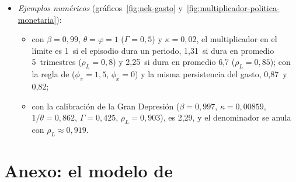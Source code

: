 \documentclass[11pt]{article}
\begin{document}
\begin{itemize}
\item \emph{Ejemplos numéricos} (gráficos~\ref{fig:nek-gasto} y~\ref{fig:multiplicador-politica-monetaria}):
  \begin{itemize}
  \item con $\beta=0{,}99$, $\theta=\varphi=1$ ($\Gamma=0{,}5$) y $\kappa=0{,}02$, el multiplicador en el límite es 1~si el episodio dura un periodo, 1,31~si dura en promedio 5~trimestres ($\rho_L=0{,}8$) y 2,25~si dura en promedio 6,7 ($\rho_L=0{,}85$); con la regla de  ($\phi_\pi=1{,}5$, $\phi_x=0$) y la misma persistencia del gasto, 0,87~y 0,82;
  \item con la calibración de la Gran Depresión ($\beta=0{,}997$, $\kappa=0{,}00859$, $1/\theta=0{,}862$, $\Gamma=0{,}425$, $\rho_L=0{,}903$), es 2,29, y el denominador se anula con $\rho_L\approx0{,}919$\nocite{Woodford2011Simple,Eggertsson2011Fiscal}.
  \end{itemize}
\end{itemize}

\section{Anexo: el modelo de }\label{anexo:leeper}
\end{document}
